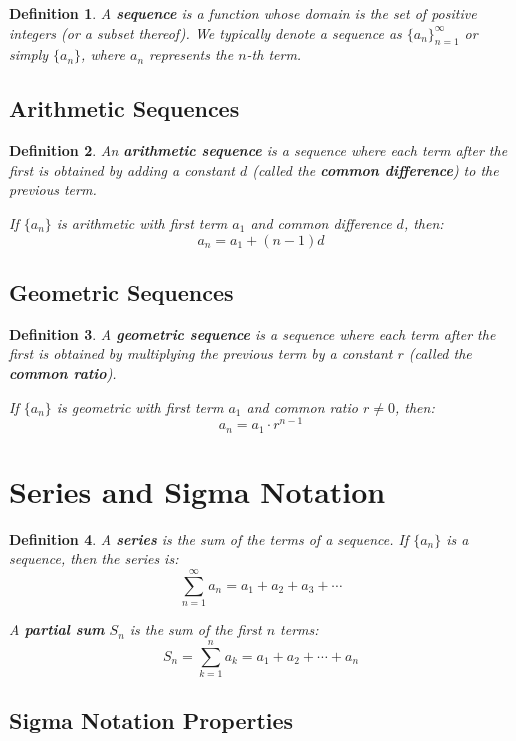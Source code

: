 \documentclass[12pt]{article}
\newtheorem{definition}{Definition}
\begin{document}
\begin{definition}
A \textbf{sequence} is a function whose domain is the set of positive integers (or a subset thereof). We typically denote a sequence as $\{a_n\}_{n=1}^{\infty}$ or simply $\{a_n\}$, where $a_n$ represents the $n$-th term.
\end{definition}

\subsection{Arithmetic Sequences}

\begin{definition}
An \textbf{arithmetic sequence} is a sequence where each term after the first is obtained by adding a constant $d$ (called the \textbf{common difference}) to the previous term.

If $\{a_n\}$ is arithmetic with first term $a_1$ and common difference $d$, then:
$$a_n = a_1 + (n-1)d$$
\end{definition}

\subsection{Geometric Sequences}

\begin{definition}
A \textbf{geometric sequence} is a sequence where each term after the first is obtained by multiplying the previous term by a constant $r$ (called the \textbf{common ratio}).

If $\{a_n\}$ is geometric with first term $a_1$ and common ratio $r \neq 0$, then:
$$a_n = a_1 \cdot r^{n-1}$$
\end{definition}

\section{Series and Sigma Notation}

\begin{definition}
A \textbf{series} is the sum of the terms of a sequence. If $\{a_n\}$ is a sequence, then the series is:
$$\sum_{n=1}^{\infty} a_n = a_1 + a_2 + a_3 + \cdots$$

A \textbf{partial sum} $S_n$ is the sum of the first $n$ terms:
$$S_n = \sum_{k=1}^{n} a_k = a_1 + a_2 + \cdots + a_n$$
\end{definition}

\subsection{Sigma Notation Properties}
\end{document}

